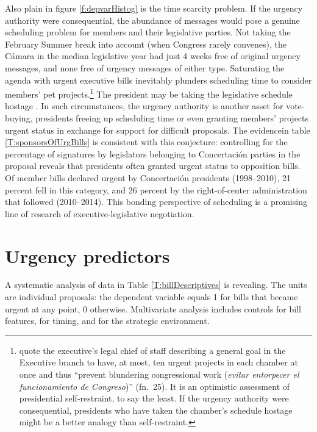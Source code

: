 \documentclass[letter,12pt]{article}
\begin{document}

Also plain in figure \ref{f:depvarHistog} is the time scarcity problem. If the urgency authority were consequential, the abundance of messages would pose a genuine scheduling problem for members and their legislative parties. Not taking the February Summer break into account (when Congress rarely convenes), the C\'amara in the median legislative year had just 4 weeks free of original urgency messages, and none free of urgency messages of either type. Saturating the agenda with urgent executive bills inevitably plunders scheduling time to consider members' pet projects.\footnote{\citet{berrios.gamboa.fiscChile.2006} quote the executive's legal chief of staff describing a general goal in the Executive branch to have, at most, ten urgent projects in each chamber at once and thus ``prevent blundering congressional work (\emph{evitar entorpecer el funcionamiento de Congreso})'' (fn.~25). It is an optimistic assessment of presidential self-restraint, to say the least. If the urgency authority were consequential, presidents who have taken the chamber's schedule hostage might be a better analogy than self-restraint.} The president may be taking the legislative schedule hostage \citep[cf.][]{cox.mccubbins.1994,williamson.1975}. In such circumstances, the urgency authority is another asset for vote-buying, presidents freeing up scheduling time or even granting members' projects urgent status in exchange for support for difficult proposals. The evidencein table \ref{T:sponsorsOfUrgBills} is consistent with this conjecture: controlling for the percentage of signatures by legislators belonging to Concertaci\'on parties in the proposal reveals that presidents often granted urgent status to opposition bills. Of member bills declared urgent by Concertaci\'on presidents (1998--2010), 21 percent fell in this category, and 26 percent by the right-of-center administration that followed (2010--2014). This bonding perspective of scheduling is a promising line of research of executive-legislative negotiation. 


\section{Urgency predictors}

A systematic analysis of data in Table \ref{T:billDescriptives} is revealing. The units are individual proposals: the dependent variable equals 1 for bills that became urgent at any point, 0 otherwise. Multivariate analysis includes controls for bill features, for timing, and for the strategic environment. 
\end{document}
